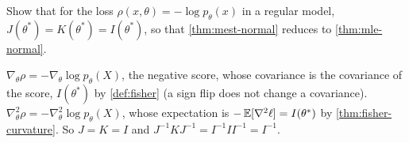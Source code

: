 \begin{exercise}
\label{ex:mest-sandwich-mle}
Show that for the loss $\rho(x, \theta) = -\log p_\theta(x)$ in a regular model, $J(\theta^*) = K(\theta^*) = I(\theta^*)$, so that \cref{thm:mest-normal} reduces to \cref{thm:mle-normal}.
\end{exercise}
\begin{solution}
$\nabla_\theta\rho = -\nabla_\theta\log p_\theta(X)$, the negative score, whose covariance is the covariance of the score, $I(\theta^*)$ by \cref{def:fisher} (a sign flip does not change a covariance). $\nabla^2_\theta\rho = -\nabla^2_\theta\log p_\theta(X)$, whose expectation is $-\operatorname*{\mathbb{E}}[\nabla^2\ell] = I(\theta^*)$ by \cref{thm:fisher-curvature}. So $J = K = I$ and $J^{-1}KJ^{-1} = I^{-1}II^{-1} = I^{-1}$.
\end{solution}
